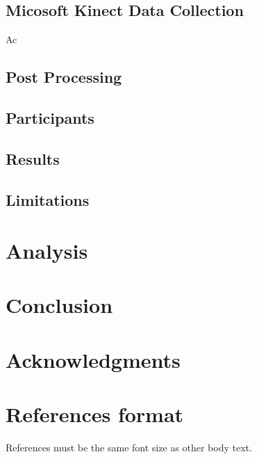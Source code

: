 \documentclass{sigchi}
\begin{document}
\subsection{Micosoft Kinect Data Collection}

Ac
\subsection{Post Processing}


\subsection{Participants}


\subsection{Results}


\subsection{Limitations}


\section{Analysis}


\section{Conclusion}


\section{Acknowledgments}


\section{References format}
References must be the same font size as other body text.



\end{document}
